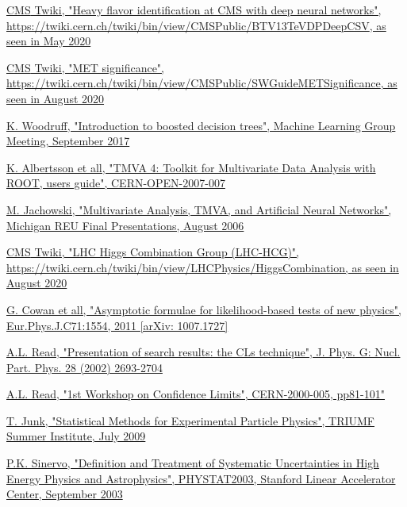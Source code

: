 \documentclass[a4paper, 10pt, openright]{report}
\begin{document}
\begin{thebibliography}{1}
\href{https://twiki.cern.ch/twiki/bin/view/CMSPublic/BTV13TeVDPDeepCSV}{\ac{CMS} Twiki,
"Heavy flavor identification at CMS with deep neural networks", \url{https://twiki.cern.ch/twiki/bin/view/CMSPublic/BTV13TeVDPDeepCSV}, as seen in May 2020}

\href{https://twiki.cern.ch/twiki/bin/view/CMSPublic/SWGuideMETSignificance}{\ac{CMS} Twiki, "MET significance", \url{https://twiki.cern.ch/twiki/bin/view/CMSPublic/SWGuideMETSignificance}, as seen in August 2020}

\href{https://indico.fnal.gov/event/15356/contributions/31377/attachments/19671/24560/DecisionTrees.pdf}{K. Woodruff,
"Introduction to boosted decision trees", Machine Learning Group Meeting, September 2017}

\href{https://indico.cern.ch/event/5007/contributions/1177811/attachments/962648/1366777/reu_presentation3.pdf}{K. Albertsson et all,
"TMVA 4: Toolkit for Multivariate Data Analysis with ROOT, users guide", CERN-OPEN-2007-007}

\href{https://root.cern.ch/root/htmldoc/guides/tmva/TMVAUsersGuide.pdf}{M. Jachowski,
"Multivariate Analysis, TMVA, and Artificial Neural Networks", Michigan REU Final Presentations, August 2006}

\href{https://twiki.cern.ch/twiki/bin/view/LHCPhysics/HiggsCombination}{\ac{CMS} Twiki,
"LHC Higgs Combination Group (LHC-HCG)", \url{https://twiki.cern.ch/twiki/bin/view/LHCPhysics/HiggsCombination}, as seen in August 2020}

\href{https://arxiv.org/abs/1007.1727}{G. Cowan et all,
"Asymptotic formulae for likelihood-based tests of new physics", Eur.Phys.J.C71:1554, 2011 [arXiv: 1007.1727]}

\href{https://indico.cern.ch/event/398949/attachments/799330/1095613/The\_CLs\_Technique.pdf}{A.L. Read, "Presentation of search results: the CLs technique", J. Phys. G: Nucl. Part. Phys. 28 (2002) 2693-2704}

\href{https://cds.cern.ch/record/411537/files/CERN-2000-005.pdf}{A.L. Read,
"1st Workshop on Confidence Limits", CERN-2000-005, pp81-101"}

\href{https://www-cdf.fnal.gov/~trj/tsi09/trjtsi_Day1.pdf}{T. Junk,
"Statistical Methods for Experimental Particle Physics", TRIUMF Summer Institute, July 2009}

\href{https://hep.physics.utoronto.ca/~pekka/papers/systematicsreview.pdf}{P.K. Sinervo,
"Definition and Treatment of Systematic Uncertainties in High Energy Physics and Astrophysics", PHYSTAT2003, Stanford Linear Accelerator Center, September 2003}


\end{thebibliography}
\end{document}
